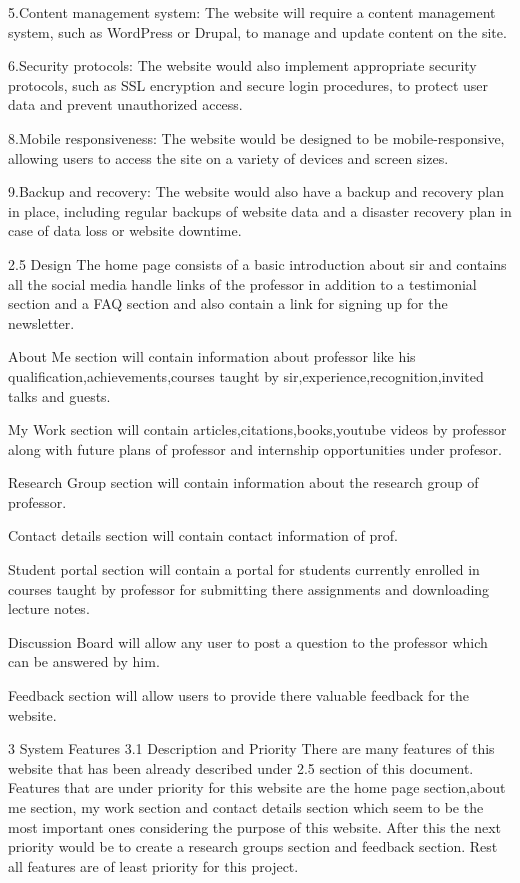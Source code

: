 5.Content management system: The website will require a content management system, such as WordPress or Drupal, to manage and update content on the site.

6.Security protocols: The website would also implement appropriate security protocols, such as SSL encryption and secure login procedures, to protect user data and prevent unauthorized access.

8.Mobile responsiveness: The website would be designed to be mobile-responsive, allowing users to access the site on a variety of devices and screen sizes.

9.Backup and recovery: The website would also have a backup and recovery plan in place, including regular backups of website data and a disaster recovery plan in case of data loss or website downtime.

2.5 Design
The home page consists of a basic introduction about sir and contains all the social media handle links of the professor in addition to a testimonial section and a FAQ section and also contain a link for signing up for the newsletter.

About Me section will contain information about professor like his qualification,achievements,courses taught by sir,experience,recognition,invited talks and guests.

My Work section will contain articles,citations,books,youtube videos by professor along with future plans of professor and internship opportunities under profesor.

Research Group section will contain information about the research group of professor.

Contact details section will contain contact information of prof.

Student portal section will contain a portal for students currently enrolled in courses taught by professor for submitting there assignments and downloading lecture notes.

Discussion Board will allow any user to post a question to the professor which can be answered by him.

Feedback section will allow users to provide there valuable feedback for the website.

3 System Features 
3.1 Description and Priority
There are many features of this website that has been already described under 2.5 section of this document.
Features that are under priority for this website are the home page section,about me section, my work section and contact details section which seem to be the most important ones considering the purpose of this website. 
After this the next priority would be to create a research groups section and feedback section.
Rest all features are of least priority for this project.

